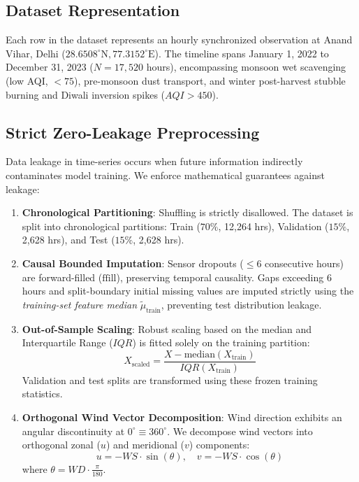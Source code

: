 \documentclass[10pt,journal,compsoc,twocolumn]{article}
\begin{document}
\subsection{Dataset Representation}
Each row in the dataset represents an hourly synchronized observation at Anand Vihar, Delhi ($28.6508^\circ \text{N}, 77.3152^\circ \text{E}$). The timeline spans January 1, 2022 to December 31, 2023 ($N = 17,520$ hours), encompassing monsoon wet scavenging (low AQI, $<75$), pre-monsoon dust transport, and winter post-harvest stubble burning and Diwali inversion spikes ($AQI > 450$).

\subsection{Strict Zero-Leakage Preprocessing}
Data leakage in time-series occurs when future information indirectly contaminates model training. We enforce mathematical guarantees against leakage:
\begin{enumerate}
    \item \textbf{Chronological Partitioning}: Shuffling is strictly disallowed. The dataset is split into chronological partitions: Train ($70\%$, 12,264 hrs), Validation ($15\%$, 2,628 hrs), and Test ($15\%$, 2,628 hrs).
    \item \textbf{Causal Bounded Imputation}: Sensor dropouts ($\le 6$ consecutive hours) are forward-filled ($\text{ffill}$), preserving temporal causality. Gaps exceeding 6 hours and split-boundary initial missing values are imputed strictly using the \textit{training-set feature median} $\tilde{\mu}_{\text{train}}$, preventing test distribution leakage.
    \item \textbf{Out-of-Sample Scaling}: Robust scaling based on the median and Interquartile Range ($IQR$) is fitted solely on the training partition:
    \begin{equation}
        X_{\text{scaled}} = \frac{X - \text{median}(X_{\text{train}})}{IQR(X_{\text{train}})}
    \end{equation}
    Validation and test splits are transformed using these frozen training statistics.
    \item \textbf{Orthogonal Wind Vector Decomposition}: Wind direction exhibits an angular discontinuity at $0^\circ \equiv 360^\circ$. We decompose wind vectors into orthogonal zonal ($u$) and meridional ($v$) components:
    \begin{equation}
        u = -WS \cdot \sin(\theta), \quad v = -WS \cdot \cos(\theta)
    \end{equation}
    where $\theta = WD \cdot \frac{\pi}{180}$.
\end{enumerate}
\end{document}
